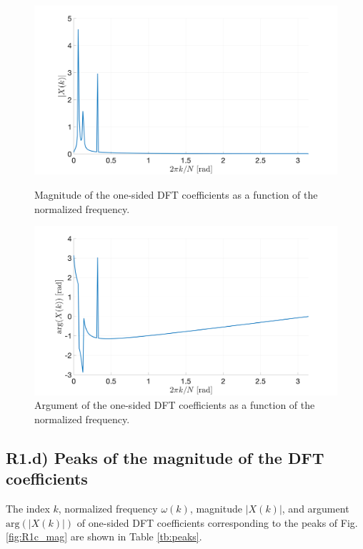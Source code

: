 \documentclass[a4paper, oneside, 11pt]{article}
\begin{document}
\begin{figure}[htbp]
	\centering
	\begin{minipage}[b]{.49\textwidth}
	    \centering
	    \includegraphics[width=1.1\textwidth]{figures/R1c_mag.png}
	    \caption{Magnitude of the one-sided DFT coefficients as a function of the normalized frequency.}
	    \label{fig:R1c_mag}
	\end{minipage}
	\hfill
	\begin{minipage}[b]{.49\textwidth}
		\centering
	    \includegraphics[width=1.1\textwidth]{figures/R1c_arg.png}
	    \caption{Argument of the one-sided DFT coefficients as a function of the normalized frequency.}
	    \label{fig:R1c_arg}
	\end{minipage}
\end{figure}

\subsection{R1.d) Peaks of the magnitude of the DFT coefficients}
The index $k$, normalized frequency $\omega(k)$, magnitude $|X(k)|$, and argument $\mathrm{arg}(|X(k)|)$ of one-sided DFT coefficients corresponding to the peaks of Fig. \ref{fig:R1c_mag} are shown in Table \ref{tb:peaks}.
\end{document}
